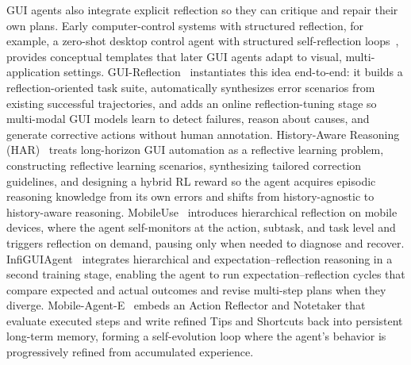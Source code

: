 GUI agents also integrate explicit reflection so they can critique and repair their own plans. Early computer-control systems with structured reflection, for example, a zero-shot desktop control agent with structured self-reflection loops~\cite{li2023zero}, provides conceptual templates that later GUI agents adapt to visual, multi-application settings. GUI-Reflection~\cite{wu2025gui} instantiates this idea end-to-end: it builds a reflection-oriented task suite, automatically synthesizes error scenarios from existing successful trajectories, and adds an online reflection-tuning stage so multi-modal GUI models learn to detect failures, reason about causes, and generate corrective actions without human annotation. History-Aware Reasoning (HAR)~\cite{wang2025history} treats long-horizon GUI automation as a reflective learning problem, constructing reflective learning scenarios, synthesizing tailored correction guidelines, and designing a hybrid RL reward so the agent acquires episodic reasoning knowledge from its own errors and shifts from history-agnostic to history-aware reasoning. MobileUse~\cite{li2025mobileuse} introduces hierarchical reflection on mobile devices, where the agent self-monitors at the action, subtask, and task level and triggers reflection on demand, pausing only when needed to diagnose and recover. InfiGUIAgent~\cite{liu2025infiguiagent} integrates hierarchical and expectation–reflection reasoning in a second training stage, enabling the agent to run expectation–reflection cycles that compare expected and actual outcomes and revise multi-step plans when they diverge. Mobile-Agent-E~\cite{wang2025mobileagente} embeds an Action Reflector and Notetaker that evaluate executed steps and write refined Tips and Shortcuts back into persistent long-term memory, forming a self-evolution loop where the agent’s behavior is progressively refined from accumulated experience. 


